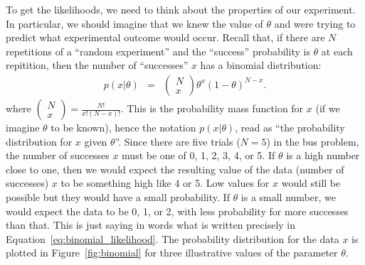 To get the likelihoods, we need to think about the properties of our experiment.
In particular, we should imagine that we knew the value of $\theta$ and were
trying to predict what experimental outcome would occur. 
Recall that,
if there are $N$
repetitions of a ``random experiment'' and the ``success'' probability is
$\theta$ at each repitition,
then the number of ``successes'' $x$ has a binomial distribution:
\begin{eqnarray}
p(x|\theta) &=& \left(\begin{array}{c}N \\ x\end{array}\right)
\theta^x\left(1-\theta\right)^{N - x}.\label{eq:binomial_likelihood2}
\end{eqnarray}
where $\left(\begin{array}{c}N \\ x\end{array}\right) = \frac{N!}{x!(N-x)!}$.
This is the probability mass function for $x$ (if we imagine $\theta$ to be known), hence the notation $p(x|\theta)$, read as ``the probability distribution for $x$ given $\theta$''.
Since there are five trials
($N=5$) in the bus problem, the number of successes $x$ must be one of
0, 1, 2, 3, 4, or 5.
If $\theta$ is a high number close to one, then we would expect the resulting
value of the data (number of successes) $x$ to be something high like 4 or 5. Low values for $x$ would
still be possible but they would have a small probability. If $\theta$ is a
small number, we would expect the data to be 0, 1, or 2, with less probability
for more successes than that. This is just saying in words what is written
precisely in Equation~\ref{eq:binomial_likelihood}. The probability distribution
for the data $x$ is plotted in Figure~\ref{fig:binomial} for three illustrative
values of the parameter $\theta$.
